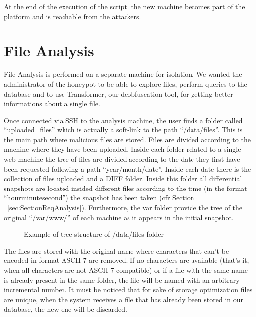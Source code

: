 At the end of the execution of the script, the new machine becomes part of the platform and is reachable from the attackers.

\section{File Analysis}

File Analysis is performed on a separate machine for isolation. We wanted the administrator of the honeypot to be able to explore files, perform queries to the database and to use Transformer, our deobfuscation tool, for getting better informations about a single file.

Once connected via SSH to the analysis machine, the user finds a folder called ``uploaded\_files'' which is actually a soft-link to the path ``/data/files''. This is the main path where malicious files are stored. Files are divided according to the machine where they have been uploaded. Inside each folder related to a single web machine the tree of files are divided according to the date they first have been requested following a path ``year/month/date''.
Inside each date there is the collection of files uploaded and a DIFF folder. Inside this folder all differential snapshots are located insided different files according to the time (in the format ``hourminutesecond'') the snapshot has been taken (cfr Section ~\ref{sec:SectionReqAnalysis}).
Furthermore, the var folder provide the tree of the original ``/var/www/'' of each machine as it appears in the initial snapshot.

\begin{figure}
\caption{Example of tree structure of /data/files folder}
\label{fig:dirtree1}
\end{figure}

The files are stored with the original name where characters that can't be encoded in format ASCII-7 are removed. If no characters are available (that's it, when all characters are not ASCII-7 compatible) or if a file with the same name is already present in the same folder, the file will be named with an arbitrary incremental number. It must be noticed that for sake of storage optimization files are unique, when the system receives a file that has already been stored in our database, the new one will be discarded.

